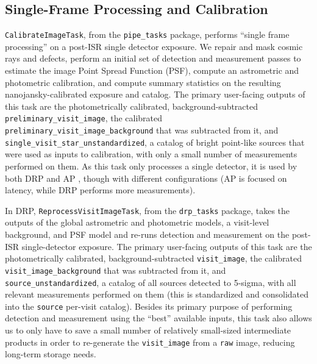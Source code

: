 \subsection{Single-Frame Processing and Calibration}
\label{sec:sfp}

\texttt{CalibrateImageTask}, from the \texttt{pipe\_tasks} package, performs ``single frame processing'' on a post-ISR  single detector exposure.
We repair and mask cosmic rays and defects, perform an initial set of detection  and measurement  passes to estimate the image Point Spread Function (PSF), compute an astrometric  and photometric  calibration, and compute summary statistics on the resulting nanojansky-calibrated exposure and catalog.
The primary user-facing outputs of this task are the photometrically calibrated, background-subtracted \texttt{preliminary\_\-visit\_\-image}, the calibrated \texttt{preliminary\_\-visit\_\-image\_\-background} that was subtracted from it, and \texttt{single\_\-visit\_\-star\_\-unstandardized}, a catalog of bright point-like sources that were used as inputs to calibration, with only a small number of measurements performed on them.
As this task only processes a single detector, it is used by both DRP  and AP , though with different configurations (AP is focused on latency, while DRP performs more measurements).

In DRP, \texttt{ReprocessVisitImageTask}, from the \texttt{drp\_tasks} package, takes the outputs of the global astrometric and photometric models, a visit-level background, and PSF model and re-runs detection and measurement on the post-ISR single-detector exposure.
The primary user-facing outputs of this task are the photometrically calibrated, background-subtracted \texttt{visit\_image}, the calibrated \texttt{visit\_image\_background} that was subtracted from it, and \texttt{source\_unstandardized}, a catalog of all sources detected to 5-sigma, with all relevant measurements performed on them (this is standardized and consolidated into the \texttt{source} per-visit catalog).
Besides its primary purpose of performing detection and measurement using the ``best'' available inputs, this task also allows us to only have to save a small number of relatively small-sized intermediate products in order to re-generate the \texttt{visit\_image} from a \texttt{raw} image, reducing long-term storage needs.
